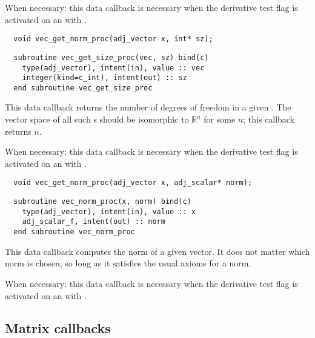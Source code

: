 When necessary: this data callback is necessary when the derivative test flag
is activated on an  with .
\begin{framed}
\vspace{-0.7cm}
\begin{verbatim}
  void vec_get_norm_proc(adj_vector x, int* sz);
\end{verbatim}
\vspace{-1.0cm}
\begin{verbatim}
  subroutine vec_get_size_proc(vec, sz) bind(c)
    type(adj_vector), intent(in), value :: vec
    integer(kind=c_int), intent(out) :: sz
  end subroutine vec_get_size_proc
\end{verbatim}
\vspace{-0.5cm}
\end{framed}
This data callback returns the number of degrees of freedom in a given . The
vector space of all such s should be isomorphic to $\mathbb{R}^n$ for some $n$;
this callback returns $n$.

When necessary: this data callback is necessary when the derivative test flag
is activated on an  with .
\begin{framed}
\vspace{-0.7cm}
\begin{verbatim}
  void vec_get_norm_proc(adj_vector x, adj_scalar* norm);
\end{verbatim}
\vspace{-1.0cm}
\begin{verbatim}
  subroutine vec_norm_proc(x, norm) bind(c)
    type(adj_vector), intent(in), value :: x
    adj_scalar_f, intent(out) :: norm
  end subroutine vec_norm_proc
\end{verbatim}
\vspace{-0.5cm}
\end{framed}
This data callback computes the norm of a given vector. It does not matter
which norm is chosen, so long as it satisfies the usual axioms for a norm.

When necessary: this data callback is necessary when the derivative test flag
is activated on an  with .
\subsection{Matrix callbacks}
